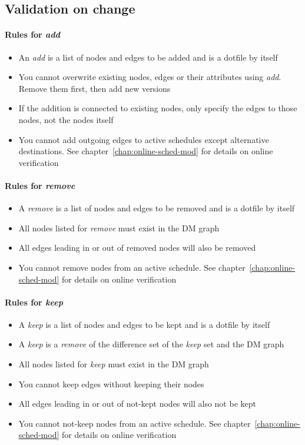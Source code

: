 \newpage
\subsection{Validation on change}
\label{ssec:val-on-change}
\paragraph{Rules for \emph{add}}
\begin{itemize}
  \item{An \emph{add} is a list of nodes and edges to be added and is a dotfile by itself}
  \item{You cannot overwrite existing nodes, edges or their attributes using \emph{add}. Remove them first, then add new versions}
  \item{If the addition is connected to existing nodes, only specify the edges to those nodes, not the nodes itself}
  \item{You cannot add outgoing edges to active schedules except alternative destinations. See chapter~\ref{chap:online-sched-mod} for details on online verification}
\end{itemize}

\paragraph{Rules for \emph{remove}}
\begin{itemize}
  \item{A \emph{remove} is a list of nodes and edges to be removed and is a dotfile by itself}
  \item{All nodes listed for \emph{remove} must exist in the DM graph}
  \item{All edges leading in or out of removed nodes will also be removed}
  \item{You cannot remove nodes from an active schedule. See chapter~\ref{chap:online-sched-mod} for details on online verification}
\end{itemize}

\paragraph{Rules for \emph{keep}}
\begin{itemize}
  \item{A \emph{keep} is a list of nodes and edges to be kept and is a dotfile by itself}
  \item{A \emph{keep} is a \emph{remove} of the difference set of the \emph{keep} set and the DM graph}
  \item{All nodes listed for \emph{keep} must exist in the DM graph}
  \item{You cannot keep edges without keeping their nodes}
  \item{All edges leading in or out of not-kept nodes will also not be kept}
  \item{You cannot not-keep nodes from an active schedule. See chapter~\ref{chap:online-sched-mod} for details on online verification}
\end{itemize}


